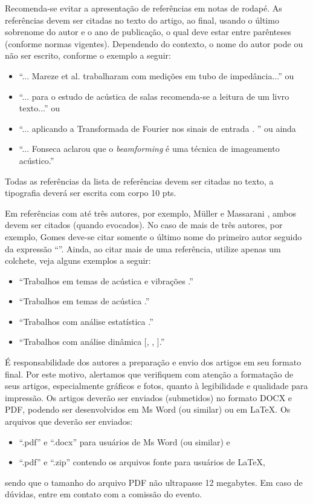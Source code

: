 \documentclass[12pt, a4paper, oneside, onecolumn] {article}%
\begin{document}
Recomenda-se evitar a apresentação de referências em notas de rodapé. As referências devem ser citadas no texto do artigo, ao final, usando o último sobrenome do autor e o ano de publicação, o qual deve estar entre parênteses (conforme normas vigentes). Dependendo do contexto, o nome do autor pode ou não ser escrito, conforme o exemplo a seguir: 
%
\begin{itemize} \itemsep=2pt
	\item 	``... Mareze et al. \cite{Mareze-2017} trabalharam com medições em tubo de impedância...'' ou 
	\item ``... para o estudo de acústica de salas \cite{Brandao-2017} recomenda-se a leitura de um livro texto...'' ou
	\item ``... aplicando a Transformada de Fourier nos sinais de entrada \cite{Oppenheim-2010}. '' ou ainda
	\item ``... Fonseca \cite{Fonseca-2013} aclarou que o \textit{beamforming} é uma técnica de imageamento acústico.''
\end{itemize}
%
Todas as referências da lista de referências devem ser citadas no texto, a tipografia deverá ser escrita com corpo 10 pts.  

Em referências com até três autores, por exemplo, Müller e Massarani \cite{Muller-2001}, ambos devem ser citados (quando evocados). No caso de mais de três autores, por exemplo, Gomes \etal \cite{Gomes-2015,Mareze-2017,Borges-2018} deve-se citar somente o último nome do primeiro autor seguido da expressão ``\etal''. Ainda, ao citar mais de uma referência, utilize apenas um colchete, veja alguns exemplos a seguir:
%
\begin{itemize} \itemsep=2pt
	\item 	``Trabalhos em temas de acústica e vibrações \cite{Mareze-2017,Fonseca-2013,Brandao-2017}.''
	\item ``Trabalhos em temas de acústica \cite{Mareze-2017,Oppenheim-2010,Muller-2001,Borges-2018}.''
	\item ``Trabalhos com análise estatística \cite{Mareze-2017, Brandao-2017, Borges-2018}.''
	\item ``Trabalhos com análise dinâmica [, , ].''
\end{itemize}

É responsabilidade dos autores a preparação e envio dos artigos em seu formato final. Por este motivo, alertamos que verifiquem com atenção a formatação de seus artigos, especialmente gráficos e fotos, quanto à legibilidade e qualidade para impressão. Os artigos deverão ser enviados (submetidos) no formato DOCX e PDF, podendo ser desenvolvidos em Ms Word (ou similar) ou em \LaTeX\xspace. Os arquivos que deverão ser enviados:
%
\begin{itemize} \itemsep=2pt
	\item ``.pdf'' e ``.docx'' para usuários de Ms Word (ou similar) e
	\item ``.pdf'' e ``.zip'' contendo os arquivos fonte para usuários de \LaTeX\xspace,
\end{itemize}
%
sendo que o tamanho do arquivo PDF não ultrapasse 12 megabytes. Em caso de dúvidas, entre em contato com a comissão do evento.
\end{document}
